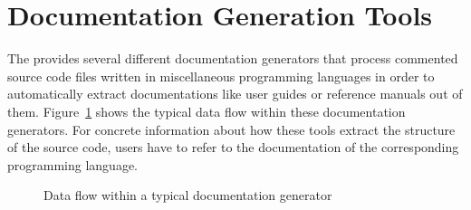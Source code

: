 \docprint
\doccheck
\dochtml
\doclatex

\section{Documentation Generation Tools}

The \ecs{} provides several different documentation generators that process commented source code files
written in miscellaneous programming languages in order to automatically extract documentations like user guides or reference manuals out of them.
Figure~\ref{fig:docgendataflow} shows the typical data flow within these documentation generators.
For concrete information about how these tools extract the structure of the source code, users have to refer to the documentation of the corresponding programming language.
\interface

\begin{figure}
\caption{Data flow within a typical documentation generator}
\label{fig:docgendataflow}
\end{figure}

\cppdoc
\cpphtml
\cpplatex
\obdoc
\obhtml
\oblatex

\concludechapter
